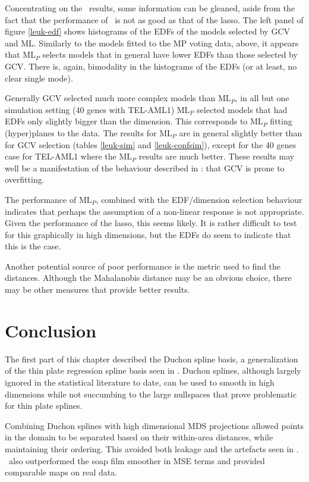 Concentrating on the \mdsds\ results, some information can be gleaned, aside from the fact that the performance of \mdsds\  is not as good as that of the lasso. The left panel of figure \ref{leuk-edf} shows histograms of the EDFs of the models selected by GCV and ML. Similarly to the models \label{cor-5s15}fitted to the MP voting data, above, it appears that $\text{ML}_P$ selects models that in general have lower EDFs than those selected by GCV. There is, again, bimodality in the histograms of the EDFs (or at least, no clear single mode). 

Generally GCV selected much more complex models than $\text{ML}_P$, in all but one simulation setting (40 genes with TEL-AML1) $\text{ML}_P$ selected models that had EDFs only slightly bigger than the dimension. This corresponds to $\text{ML}_P$ fitting (hyper)planes to the data. The results for $\text{ML}_P$ are in general slightly better than for GCV selection (tables \ref{leuk-sim} and \ref{leuk-confsim}), except for the 40 genes case for TEL-AML1 where the $\text{ML}_P$ results are much better. These results may well be a manifestation of the behaviour described in : that GCV is prone to overfitting.

The performance of $\text{ML}_P$, combined with the EDF/dimension selection behaviour indicates that perhaps the assumption of a \label{cor-r55}non-linear response is not appropriate. Given the performance of the lasso, this seems likely. It is rather difficult to test for this graphically in high dimensions, but the EDFs do seem to indicate that this is the case.

Another potential source of poor performance is the metric used to find the distances. Although the Mahalanobis distance may be an obvious choice, there may be other measures that provide better results.


\section{Conclusion}
\label{gds-gds-conc}

The first part of this chapter described the Duchon spline basis, a generalization of the thin plate regression spline basis seen in . Duchon splines, although largely ignored in the statistical literature to date, can be used to smooth in high dimensions while not succumbing to the large nullspaces that prove problematic for thin plate splines.

Combining Duchon splines with high dimensional MDS projections allowed points in the domain to be separated based on their within-area distances, while maintaining their ordering. This avoided both leakage and the artefacts seen in . \mdsds\ also outperformed the soap film smoother in MSE terms and provided comparable maps on real data.

